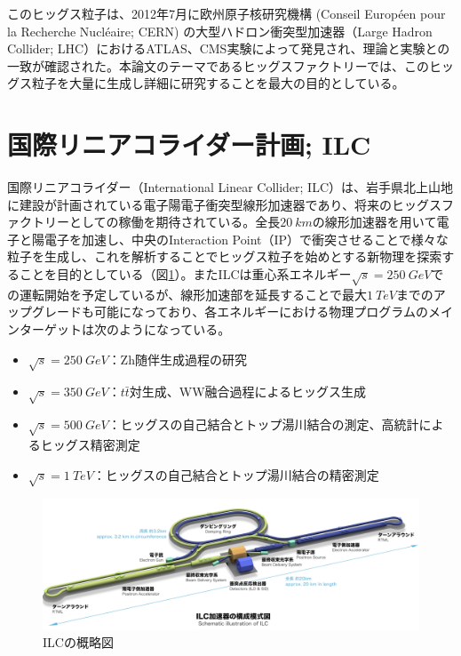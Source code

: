 このヒッグス粒子は、2012年7月に欧州原子核研究機構 (Conseil Europ\'een pour la Recherche Nucl\'eaire; CERN) の大型ハドロン衝突型加速器（Large Hadron Collider; LHC）におけるATLAS、CMS実験によって発見され、理論と実験との一致が確認された。本論文のテーマであるヒッグスファクトリーでは、このヒッグス粒子を大量に生成し詳細に研究することを最大の目的としている。\\

\section{国際リニアコライダー計画; ILC}
国際リニアコライダー（International Linear Collider; ILC）は、岩手県北上山地に建設が計画されている電子陽電子衝突型線形加速器であり、将来のヒッグスファクトリーとしての稼働を期待されている。全長$\SI{20}{km}$の線形加速器を用いて電子と陽電子を加速し、中央のInteraction Point（IP）で衝突させることで様々な粒子を生成し、これを解析することでヒッグス粒子を始めとする新物理を探索することを目的としている（図\ref{ilc}）。またILCは重心系エネルギー$\sqrt{s} = \SI{250}{GeV}$での運転開始を予定しているが、線形加速部を延長することで最大$\SI{1}{TeV}$までのアップグレードも可能になっており、各エネルギーにおける物理プログラムのメインターゲットは次のようになっている。
\begin{itemize}
\item $\sqrt{s} = \SI{250}{GeV}$：Zh随伴生成過程の研究
\item $\sqrt{s} = \SI{350}{GeV}$：$t\bar{t}$対生成、WW融合過程によるヒッグス生成
\item $\sqrt{s} = \SI{500}{GeV}$：ヒッグスの自己結合とトップ湯川結合の測定、高統計によるヒッグス精密測定
\item $\sqrt{s} = \SI{1}{TeV}$：ヒッグスの自己結合とトップ湯川結合の精密測定
\end{itemize}
\begin{figure}[t]
	\begin{center}
 \includegraphics[keepaspectratio, scale=0.25]
 	{Figure/Introduction/ilc.png}
 		\caption{ILCの概略図}
 		\label{ilc}
	\end{center}
\end{figure}

